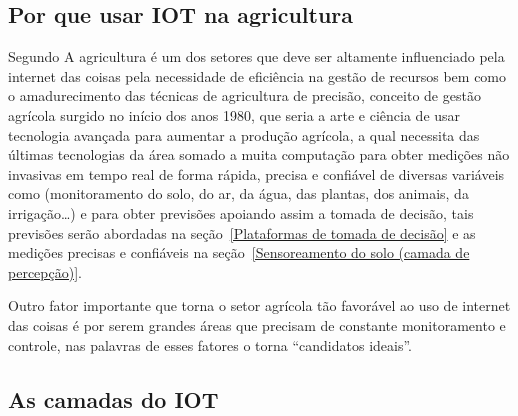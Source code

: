\documentclass[
article,			%
12pt,				%
oneside,			%
a4paper,			%
english,			%
brazil,				%
sumario=tradicional
]{abntex2}
\begin{document}
\subsection{Por que usar IOT na agricultura}\label{Por que usar IOT na agricultura}
Segundo \citeauthor{5} A agricultura é um dos setores que deve ser altamente influenciado pela internet das coisas pela necessidade de eficiência na gestão de recursos bem como o amadurecimento das técnicas de agricultura de precisão, conceito de gestão agrícola surgido no início dos anos 1980\cite{4}, que seria a arte e ciência de usar tecnologia avançada para aumentar a produção agrícola\cite{9}, a qual necessita das últimas tecnologias da área somado a muita computação para obter medições não invasivas em tempo real de forma rápida, precisa e confiável de diversas variáveis como (monitoramento do solo, do ar, da água, das plantas, dos animais, da irrigação\ldots)\cite{10} e para obter previsões apoiando assim a tomada de decisão, tais previsões serão abordadas na seção~\ref{Plataformas de tomada de decisão} e as medições precisas e confiáveis na seção~\ref{Sensoreamento do solo (camada de percepção)}.

Outro fator importante que torna o setor agrícola tão favorável ao uso de internet das coisas é por serem grandes áreas que precisam de constante monitoramento e controle, nas palavras de \citeauthor{10} esses fatores o torna ``candidatos ideais''.

\subsection{As camadas do IOT}\label{As camadas do IOT}
\end{document}
